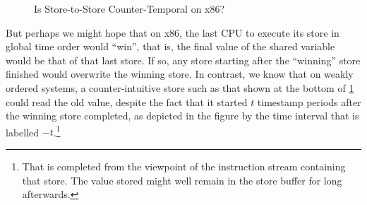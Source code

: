 {\begin{figure}
\centering
{}
\caption{Is Store-to-Store Counter-Temporal on x86?}
\label{fig:memorder:Is Store-to-Store Counter-Temporal on x86?}
\end{figure}

	But perhaps we might hope that on x86, the last CPU to execute its
	store in global time order would ``win'', that is, the final value
	of the shared variable would be that of that last store.
	If so, any store starting after the ``winning'' store finished would
	overwrite the winning store.
	In contrast, we know that on weakly ordered systems, a
	counter-intuitive store such as that shown at the bottom of
	\cref{fig:memorder:Is Store-to-Store Counter-Temporal on x86?}
	could read the old value, despite the fact that it started
	$t$ timestamp periods after the winning store completed,
	as depicted in the figure by the time interval that is labelled
	$-t$.\footnote{
		That is completed from the viewpoint of the instruction
		stream containing that store.
		The value stored might well remain in the store buffer
		for long afterwards.}

}
